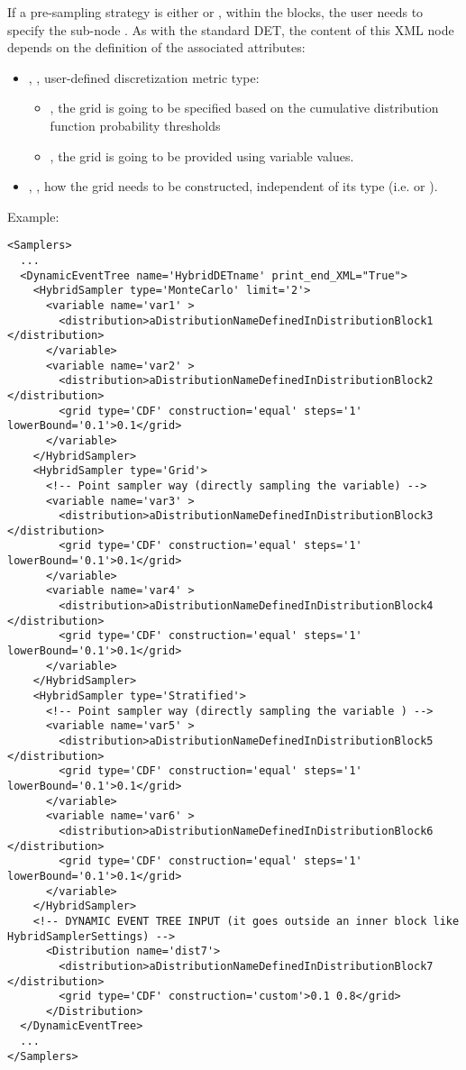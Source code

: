 If a pre-sampling strategy  is either  or
, within the  blocks, the user needs to
specify the sub-node .
%
As with the standard DET, the content of this XML node depends on the definition
of the associated attributes:
\begin{itemize}
\itemsep0em
\item {}, , user-defined
  discretization metric type:
  \begin{itemize}
    \item {}, the grid is going to be specified based on the
      cumulative distribution function probability thresholds
    \item {}, the grid is going to be provided using variable
      values.
  \end{itemize}
  \item {}, , how the
    grid needs to be constructed, independent of its type (i.e. 
    or ).
\end{itemize}
\constructionGridDescription

Example:
\begin{lstlisting}[style=XML]
<Samplers>
  ...
  <DynamicEventTree name='HybridDETname' print_end_XML="True">
    <HybridSampler type='MonteCarlo' limit='2'>
      <variable name='var1' >
        <distribution>aDistributionNameDefinedInDistributionBlock1 </distribution>
      </variable>
      <variable name='var2' >
        <distribution>aDistributionNameDefinedInDistributionBlock2 </distribution>
        <grid type='CDF' construction='equal' steps='1' lowerBound='0.1'>0.1</grid>
      </variable>
    </HybridSampler>
    <HybridSampler type='Grid'>
      <!-- Point sampler way (directly sampling the variable) -->
      <variable name='var3' >
        <distribution>aDistributionNameDefinedInDistributionBlock3 </distribution>
        <grid type='CDF' construction='equal' steps='1' lowerBound='0.1'>0.1</grid>
      </variable>
      <variable name='var4' >
        <distribution>aDistributionNameDefinedInDistributionBlock4 </distribution>
        <grid type='CDF' construction='equal' steps='1' lowerBound='0.1'>0.1</grid>
      </variable>
    </HybridSampler>
    <HybridSampler type='Stratified'>
      <!-- Point sampler way (directly sampling the variable ) -->
      <variable name='var5' >
        <distribution>aDistributionNameDefinedInDistributionBlock5 </distribution>
        <grid type='CDF' construction='equal' steps='1' lowerBound='0.1'>0.1</grid>
      </variable>
      <variable name='var6' >
        <distribution>aDistributionNameDefinedInDistributionBlock6 </distribution>
        <grid type='CDF' construction='equal' steps='1' lowerBound='0.1'>0.1</grid>
      </variable>
    </HybridSampler>
    <!-- DYNAMIC EVENT TREE INPUT (it goes outside an inner block like HybridSamplerSettings) -->
      <Distribution name='dist7'>
        <distribution>aDistributionNameDefinedInDistributionBlock7 </distribution>
        <grid type='CDF' construction='custom'>0.1 0.8</grid>
      </Distribution>
  </DynamicEventTree>
  ...
</Samplers>
\end{lstlisting}

